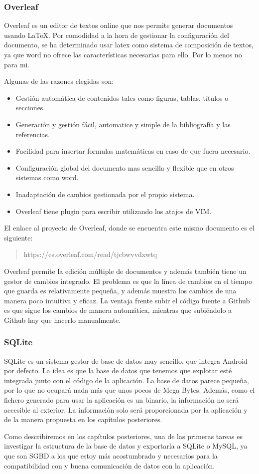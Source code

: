 \subsubsection{Overleaf}
Overleaf \cite{overleaf} es un editor de textos online que nos permite generar documentos usando \LaTeX. Por comodidad a la hora de gestionar la configuración del documento, se ha determinado usar latex como sistema de composición de textos, ya que word no ofrece las características necesarias para ello. Por lo menos no para mi. 

Algunas de las razones elegidas son:
\begin{itemize}
    \item Gestión automática de contenidos tales como figuras, tablas, títulos o secciones. 
    \item Generación y gestión fácil, automatice y simple de la bibliografía y las referencias.
    \item Facilidad para insertar formulas matemáticas en caso de que fuera necesario. 
    \item Configuración global del documento mas sencilla y flexible que en otros sistemas como word.
    \item Inadaptación de cambios gestionada por el propio sistema. 
    \item Overleaf tiene plugin para escribir utilizando los atajos de VIM. 
\end{itemize}

El enlace al proyecto de Overleaf, donde se encuentra este mismo documento es el siguiente:

\begin{quote}
https://es.overleaf.com/read/tjcbwvvdxwtq
\end{quote}

Overleaf permite la edición múltiple de documentos y además también tiene un gestor de cambios integrado. El problema es que la línea de cambios en el tiempo que guarda es relativamente pequeña, y además muestra los cambios de una manera poco intuitiva y eficaz. La ventaja frente subir el código fuente a Github es que sigue los cambios de manera automática, mientras que subiéndolo a Github hay que hacerlo manualmente. 

\subsubsection{SQLite}
SQLite \cite{sqlite} es un sistema gestor de base de datos muy sencillo, que integra Android por defecto. La idea es que la base de datos que tenemos que explotar esté integrada junto con el código de la aplicación. La base de datos parece pequeña, por lo que no ocupará nada más que unos pocos de Mega Bytes. Además, como el fichero generado para usar la aplicación es un binario, la información no será accesible al exterior. La información solo será proporcionada por la aplicación y de la manera propuesta en los capítulos posteriores. 

Como describiremos en los capítulos posteriores, una de las primeras tareas es investigar la estructura de la base de datos y exportarla a SQLite o MySQL, ya que son SGBD a los que estoy más acostumbrado y necesarios para la compatibilidad con y buena comunicación de datos con la aplicación. 